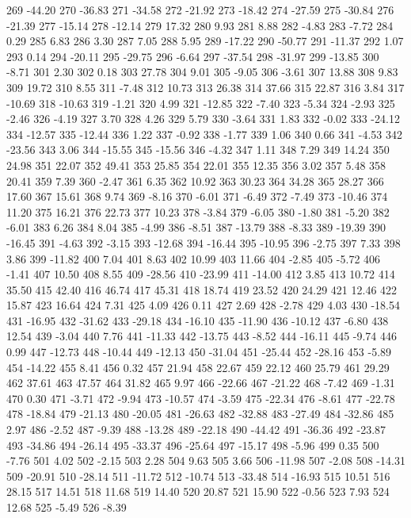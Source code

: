 269 -44.20
270 -36.83
271 -34.58
272 -21.92
273 -18.42
274 -27.59
275 -30.84
276 -21.39
277 -15.14
278 -12.14
279 17.32
280 9.93
281 8.88
282 -4.83
283 -7.72
284 0.29
285 6.83
286 3.30
287 7.05
288 5.95
289 -17.22
290 -50.77
291 -11.37
292 1.07
293 0.14
294 -20.11
295 -29.75
296 -6.64
297 -37.54
298 -31.97
299 -13.85
300 -8.71
301 2.30
302 0.18
303 27.78
304 9.01
305 -9.05
306 -3.61
307 13.88
308 9.83
309 19.72
310 8.55
311 -7.48
312 10.73
313 26.38
314 37.66
315 22.87
316 3.84
317 -10.69
318 -10.63
319 -1.21
320 4.99
321 -12.85
322 -7.40
323 -5.34
324 -2.93
325 -2.46
326 -4.19
327 3.70
328 4.26
329 5.79
330 -3.64
331 1.83
332 -0.02
333 -24.12
334 -12.57
335 -12.44
336 1.22
337 -0.92
338 -1.77
339 1.06
340 0.66
341 -4.53
342 -23.56
343 3.06
344 -15.55
345 -15.56
346 -4.32
347 1.11
348 7.29
349 14.24
350 24.98
351 22.07
352 49.41
353 25.85
354 22.01
355 12.35
356 3.02
357 5.48
358 20.41
359 7.39
360 -2.47
361 6.35
362 10.92
363 30.23
364 34.28
365 28.27
366 17.60
367 15.61
368 9.74
369 -8.16
370 -6.01
371 -6.49
372 -7.49
373 -10.46
374 11.20
375 16.21
376 22.73
377 10.23
378 -3.84
379 -6.05
380 -1.80
381 -5.20
382 -6.01
383 6.26
384 8.04
385 -4.99
386 -8.51
387 -13.79
388 -8.33
389 -19.39
390 -16.45
391 -4.63
392 -3.15
393 -12.68
394 -16.44
395 -10.95
396 -2.75
397 7.33
398 3.86
399 -11.82
400 7.04
401 8.63
402 10.99
403 11.66
404 -2.85
405 -5.72
406 -1.41
407 10.50
408 8.55
409 -28.56
410 -23.99
411 -14.00
412 3.85
413 10.72
414 35.50
415 42.40
416 46.74
417 45.31
418 18.74
419 23.52
420 24.29
421 12.46
422 15.87
423 16.64
424 7.31
425 4.09
426 0.11
427 2.69
428 -2.78
429 4.03
430 -18.54
431 -16.95
432 -31.62
433 -29.18
434 -16.10
435 -11.90
436 -10.12
437 -6.80
438 12.54
439 -3.04
440 7.76
441 -11.33
442 -13.75
443 -8.52
444 -16.11
445 -9.74
446 0.99
447 -12.73
448 -10.44
449 -12.13
450 -31.04
451 -25.44
452 -28.16
453 -5.89
454 -14.22
455 8.41
456 0.32
457 21.94
458 22.67
459 22.12
460 25.79
461 29.29
462 37.61
463 47.57
464 31.82
465 9.97
466 -22.66
467 -21.22
468 -7.42
469 -1.31
470 0.30
471 -3.71
472 -9.94
473 -10.57
474 -3.59
475 -22.34
476 -8.61
477 -22.78
478 -18.84
479 -21.13
480 -20.05
481 -26.63
482 -32.88
483 -27.49
484 -32.86
485 2.97
486 -2.52
487 -9.39
488 -13.28
489 -22.18
490 -44.42
491 -36.36
492 -23.87
493 -34.86
494 -26.14
495 -33.37
496 -25.64
497 -15.17
498 -5.96
499 0.35
500 -7.76
501 4.02
502 -2.15
503 2.28
504 9.63
505 3.66
506 -11.98
507 -2.08
508 -14.31
509 -20.91
510 -28.14
511 -11.72
512 -10.74
513 -33.48
514 -16.93
515 10.51
516 28.15
517 14.51
518 11.68
519 14.40
520 20.87
521 15.90
522 -0.56
523 7.93
524 12.68
525 -5.49
526 -8.39
